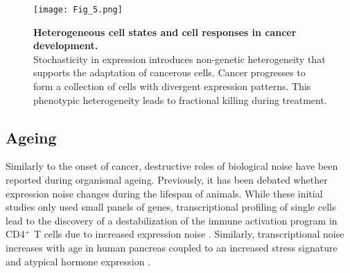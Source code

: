 \begin{figure}[!h]
\centering
\texttt{[image: Fig\_5.png]}
\caption[Heterogeneous cell states and cell responses in cancer development]{\textbf{Heterogeneous cell states and cell responses in cancer development.}\\
Stochasticity in expression introduces non-genetic heterogeneity that supports the adaptation of cancerous cells. Cancer progresses to form a collection of cells with divergent expression patterns. This phenotypic heterogeneity leads to fractional killing during treatment.}
\label{fig0:bedhedging}
\end{figure}

\newpage

\subsection{Ageing}

Similarly to the onset of cancer, destructive roles of biological noise have been reported during organismal ageing. Previously, it has been debated whether expression noise changes during the lifespan of animals\cite{Bahar2006, Warren2007}. While these initial studies only used small panels of genes, transcriptional profiling of single cells lead to the discovery of a destabilization of the immune activation program in CD4$^+$ T cells due to increased expression noise \cite{Martinez-jimenez2017}. Similarly, transcriptional noise increases with age in human pancreas coupled to an increased stress signature and atypical hormone expression \citep{Enge2017}. \\


